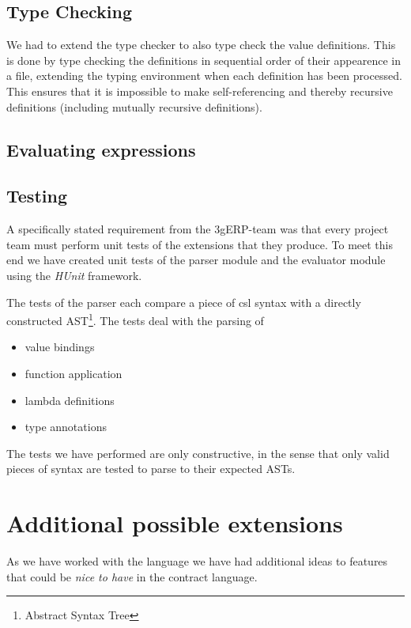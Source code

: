 \documentclass[10pt,a4paper,final,oneside,openany,article]{memoir}
\begin{document}

\section{Type Checking}
We had to extend the type checker to also type check the value
definitions. This is done by type checking the definitions in sequential
order of their appearence in a file, extending the typing environment
when each definition has been processed. This ensures that it is
impossible to make self-referencing and thereby recursive definitions
(including mutually recursive definitions).

\section{Evaluating expressions}

\section{Testing}
A specifically stated requirement from the 3gERP-team was that every
project team must perform unit tests of the extensions that they
produce. To meet this end we have created unit tests of the parser
module and the evaluator module using the \emph{HUnit} framework.

The tests of the parser each compare a piece of csl syntax with a
directly constructed AST\footnote{Abstract Syntax Tree}.  The tests
deal with the parsing of

\begin{itemize}

  \item value bindings

  \item function application

  \item lambda definitions

  \item type annotations

\end{itemize}

The tests we have performed are only constructive, in the sense that
only valid pieces of syntax are tested to parse to their expected
ASTs.

\chapter{Additional possible extensions} As we have worked with the
language we have had additional ideas to features that could be
\textit{nice to have} in the contract language.
\end{document}
